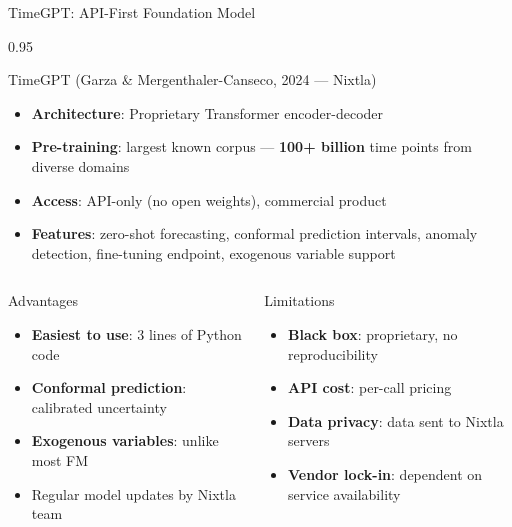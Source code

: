 \documentclass[9pt, aspectratio=169, t]{beamer}
\begin{document}
\begin{frame}{TimeGPT: API-First Foundation Model}
    \begin{cminipage}{0.95\textwidth}
    \vspace{-2mm}
    {\scriptsize
    \begin{block}{TimeGPT (Garza \& Mergenthaler-Canseco, 2024 --- Nixtla)}
        \begin{itemize}\setlength{\itemsep}{0pt}
            \item \textbf{Architecture}: Proprietary Transformer encoder-decoder
            \item \textbf{Pre-training}: largest known corpus --- \textbf{100+ billion} time points from diverse domains
            \item \textbf{Access}: API-only (no open weights), commercial product
            \item \textbf{Features}: zero-shot forecasting, conformal prediction intervals, anomaly detection, fine-tuning endpoint, exogenous variable support
        \end{itemize}
    \end{block}
    \vspace{-2mm}
    \begin{columns}[T]
        \begin{exampleblock}{Advantages}
            \begin{itemize}\setlength{\itemsep}{0pt}
                \item \textbf{Easiest to use}: 3 lines of Python code
                \item \textbf{Conformal prediction}: calibrated uncertainty
                \item \textbf{Exogenous variables}: unlike most FM
                \item Regular model updates by Nixtla team
            \end{itemize}
        \end{exampleblock}

        \begin{alertblock}{Limitations}
            \begin{itemize}\setlength{\itemsep}{0pt}
                \item \textbf{Black box}: proprietary, no reproducibility
                \item \textbf{API cost}: per-call pricing
                \item \textbf{Data privacy}: data sent to Nixtla servers
                \item \textbf{Vendor lock-in}: dependent on service availability
            \end{itemize}
        \end{alertblock}
    \end{columns}
    }
    \end{cminipage}
\end{frame}
\end{document}
